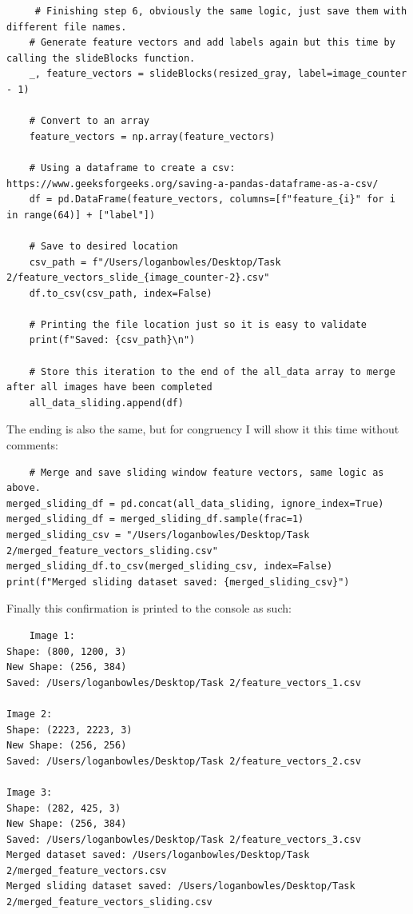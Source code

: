 \documentclass[conference]{IEEEtran} %
\begin{document}
\begin{lstlisting}
     # Finishing step 6, obviously the same logic, just save them with different file names.
    # Generate feature vectors and add labels again but this time by calling the slideBlocks function.  
    _, feature_vectors = slideBlocks(resized_gray, label=image_counter - 1)  
    
    # Convert to an array
    feature_vectors = np.array(feature_vectors)  
    
    # Using a dataframe to create a csv: https://www.geeksforgeeks.org/saving-a-pandas-dataframe-as-a-csv/
    df = pd.DataFrame(feature_vectors, columns=[f"feature_{i}" for i in range(64)] + ["label"])

    # Save to desired location
    csv_path = f"/Users/loganbowles/Desktop/Task 2/feature_vectors_slide_{image_counter-2}.csv"
    df.to_csv(csv_path, index=False)
    
    # Printing the file location just so it is easy to validate
    print(f"Saved: {csv_path}\n")
    
    # Store this iteration to the end of the all_data array to merge after all images have been completed
    all_data_sliding.append(df)
\end{lstlisting}

The ending is also the same, but for congruency I will show it this time without comments:

\begin{lstlisting}
    # Merge and save sliding window feature vectors, same logic as above.
merged_sliding_df = pd.concat(all_data_sliding, ignore_index=True)
merged_sliding_df = merged_sliding_df.sample(frac=1)  
merged_sliding_csv = "/Users/loganbowles/Desktop/Task 2/merged_feature_vectors_sliding.csv"
merged_sliding_df.to_csv(merged_sliding_csv, index=False)
print(f"Merged sliding dataset saved: {merged_sliding_csv}")
\end{lstlisting}

Finally this confirmation is printed to the console as such:

\begin{lstlisting}
    Image 1: 
Shape: (800, 1200, 3)
New Shape: (256, 384)
Saved: /Users/loganbowles/Desktop/Task 2/feature_vectors_1.csv

Image 2: 
Shape: (2223, 2223, 3)
New Shape: (256, 256)
Saved: /Users/loganbowles/Desktop/Task 2/feature_vectors_2.csv

Image 3: 
Shape: (282, 425, 3)
New Shape: (256, 384)
Saved: /Users/loganbowles/Desktop/Task 2/feature_vectors_3.csv
Merged dataset saved: /Users/loganbowles/Desktop/Task 2/merged_feature_vectors.csv
Merged sliding dataset saved: /Users/loganbowles/Desktop/Task 2/merged_feature_vectors_sliding.csv
\end{lstlisting}
\end{document}
